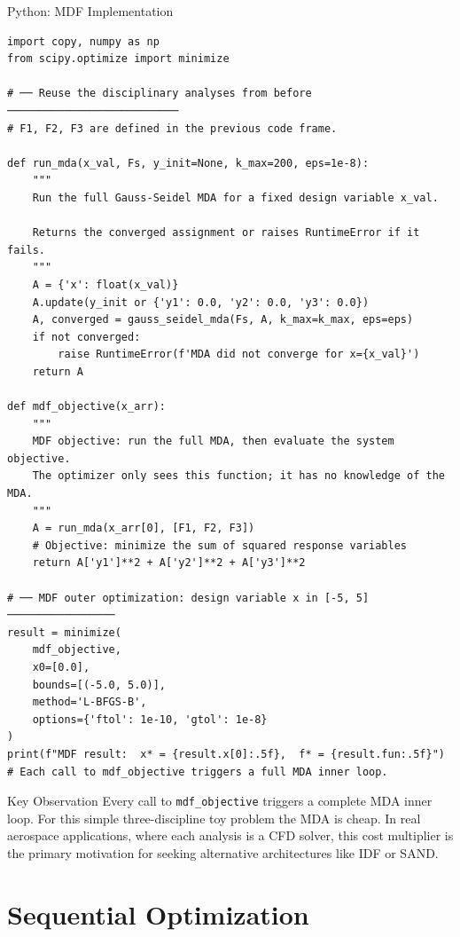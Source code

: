 \documentclass[aspectratio=169,10pt]{beamer}
\begin{document}
\begin{frame}[fragile]{Python: MDF Implementation}

  \begin{lstlisting}[style=python]
import copy, numpy as np
from scipy.optimize import minimize

# ── Reuse the disciplinary analyses from before ───────────────────────────
# F1, F2, F3 are defined in the previous code frame.

def run_mda(x_val, Fs, y_init=None, k_max=200, eps=1e-8):
    """
    Run the full Gauss-Seidel MDA for a fixed design variable x_val.

    Returns the converged assignment or raises RuntimeError if it fails.
    """
    A = {'x': float(x_val)}
    A.update(y_init or {'y1': 0.0, 'y2': 0.0, 'y3': 0.0})
    A, converged = gauss_seidel_mda(Fs, A, k_max=k_max, eps=eps)
    if not converged:
        raise RuntimeError(f'MDA did not converge for x={x_val}')
    return A

def mdf_objective(x_arr):
    """
    MDF objective: run the full MDA, then evaluate the system objective.
    The optimizer only sees this function; it has no knowledge of the MDA.
    """
    A = run_mda(x_arr[0], [F1, F2, F3])
    # Objective: minimize the sum of squared response variables
    return A['y1']**2 + A['y2']**2 + A['y3']**2

# ── MDF outer optimization: design variable x in [-5, 5] ─────────────────
result = minimize(
    mdf_objective,
    x0=[0.0],
    bounds=[(-5.0, 5.0)],
    method='L-BFGS-B',
    options={'ftol': 1e-10, 'gtol': 1e-8}
)
print(f"MDF result:  x* = {result.x[0]:.5f},  f* = {result.fun:.5f}")
# Each call to mdf_objective triggers a full MDA inner loop.
  \end{lstlisting}

  \begin{alertblock}{Key Observation}
    Every call to \texttt{mdf\_objective} triggers a complete MDA inner
    loop.  For this simple three-discipline toy problem the MDA is cheap.
    In real aerospace applications, where each analysis is a CFD solver,
    this cost multiplier is the primary motivation for seeking alternative
    architectures like IDF or SAND.
  \end{alertblock}

\end{frame}

\section{Sequential Optimization}
\end{document}
